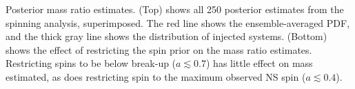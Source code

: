Posterior mass ratio estimates.  (Top) shows all 250 posterior estimates from the spinning analysis, superimposed.  The red line shows the ensemble-averaged PDF, and the thick gray line shows the distribution of injected systems. (Bottom) shows the effect of restricting the spin prior on the mass ratio estimates.  Restricting spins to be below break-up ($a\lesssim0.7$) has little effect on mass estimated, as does restricting spin to the maximum observed NS spin ($a\lesssim0.4$).